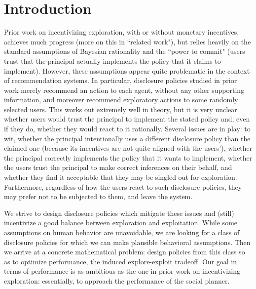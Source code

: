 \section{Introduction}
\label{sec:intro}



 Prior work on incentivizing exploration, with or without monetary incentives, achieves much progress (more on this in ``related work"), but relies heavily on the standard assumptions of Bayesian rationality and the ``power to commit" (\ie users trust that the principal actually implements the policy that it claims to implement). However, these assumptions appear quite problematic in the context of recommendation systems. In particular, disclosure policies studied in prior work merely recommend an action to each agent, without any other supporting information, and moreover recommend exploratory actions to some randomly selected users. This works out extremely well in theory, but it is very unclear whether users would trust the principal to implement the stated policy and, even if they do, whether they would react to it rationally. Several issues are in play: to wit, whether the principal intentionally uses a different disclosure policy than the claimed one (\eg because its incentives are not quite aligned with the users'), whether the principal correctly implements the policy that it wants to implement, whether the users trust the principal to make correct inferences on their behalf, and whether they find it acceptable that they may be singled out for exploration. Furthermore, regardless of how the users react to such disclosure policies, they may prefer not to be subjected to them, and leave the system.

We strive to design disclosure policies which mitigate these issues and (still) incentivize a good balance between exploration and exploitation. While some assumptions on human behavior are unavoidable, we are looking for a class of disclosure policies for which we can make plausible behavioral assumptions. Then we arrive at a concrete mathematical problem: design policies from this class so as to optimize performance, \ie  the induced explore-exploit tradeoff. Our goal in terms of performance is as ambitious as the one in prior work on incentivizing exploration: essentially, to approach the performance of the social planner.

